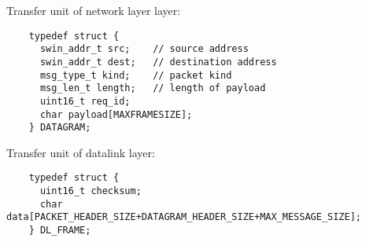 \documentclass[11pt,a4paper,oneside]{report}
\begin{document}
Transfer unit of network layer layer:    
    \begin{lstlisting}
    typedef struct {
      swin_addr_t src;    // source address
      swin_addr_t dest;   // destination address
      msg_type_t kind;    // packet kind
      msg_len_t length;   // length of payload
      uint16_t req_id;
      char payload[MAXFRAMESIZE];
    } DATAGRAM;
   \end{lstlisting}

Transfer unit of datalink layer:  
    \begin{lstlisting}
    typedef struct {
      uint16_t checksum;
      char data[PACKET_HEADER_SIZE+DATAGRAM_HEADER_SIZE+MAX_MESSAGE_SIZE];
    } DL_FRAME;
   \end{lstlisting}
   
\end{document}

